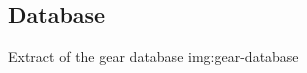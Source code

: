 \subsection{Database} \label{sec:gear-database}

{Extract of the gear database}
{img:gear-database}

